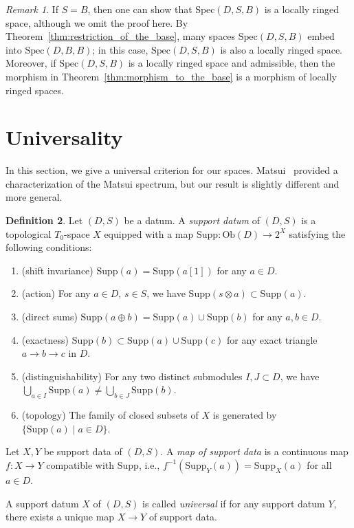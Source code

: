 \documentclass[11pt]{amsart}
\theoremstyle{definition}
\newtheorem{defn}{Definition}[section]
\theoremstyle{plain}
\theoremstyle{remark}
\newtheorem{rem}[defn]{Remark}
\newcommand{\Spec}{\mathrm{Spec}}
\newcommand{\mo}{\mathrm}
\newcommand{\Supp}{\mathrm{Supp}}
\numberwithin{equation}{section}
\begin{document}
\begin{rem}
If \(S=B\), then one can show that \(\Spec(D,S,B)\) is a locally ringed space, although we omit the proof here.
By Theorem~\ref{thm:restriction_of_the_base}, many spaces \(\Spec(D,S,B)\) embed into \(\Spec(D,B,B)\); in this case, \(\Spec(D,S,B)\) is also a locally ringed space.
Moreover, if \(\Spec(D,S,B)\) is a locally ringed space and admissible, then the morphism in Theorem~\ref{thm:morphism_to_the_base} is a morphism of locally ringed spaces.
\end{rem}

\section{Universality}\label{section:universality}
In this section, we give a universal criterion for our spaces.
Matsui~\cite{Ma1} provided a characterization of the Matsui spectrum, but our result is slightly different and more general.

\begin{defn}
  Let \((D,S)\) be a datum.
  A \emph{support datum} of \((D,S)\) is a topological \(T_0\)-space \(X\) equipped with a map \(\Supp:\mo{Ob}(D)\to 2^X\) satisfying the following conditions:
  \begin{enumerate}
    \item (shift invariance) \(\Supp(a)=\Supp(a[1])\) for any \(a\in D\).
    \item (action) For any \(a\in D\), \(s\in S\), we have \(\Supp(s\otimes a)\subset \Supp(a)\).
    \item (direct sums) \(\Supp(a\oplus b)=\Supp(a)\cup \Supp(b)\) for any \(a,b\in D\).
    \item (exactness) \(\Supp(b)\subset \Supp(a)\cup \Supp(c)\) for any exact triangle \(a\to b\to c\) in \(D\).
    \item (distinguishability) For any two distinct submodules \(I,J\subset D\), we have \(\bigcup_{a\in I}\Supp(a)\neq \bigcup_{b\in J}\Supp(b)\).
    \item (topology) The family of closed subsets of \(X\) is generated by \(\{\Supp(a)\mid a\in D\}\).
  \end{enumerate}
  Let \(X,Y\) be support data of \((D,S)\).
  A \emph{map of support data} is a continuous map \(f:X\to Y\) compatible with \(\Supp\), i.e., \(f^{-1}(\Supp_Y(a))=\Supp_X(a)\) for all \(a\in D\).

  A support datum \(X\) of \((D,S)\) is called \emph{universal} if for any support datum \(Y\), there exists a unique map \(X\to Y\) of support data.
\end{defn}
\end{document}
